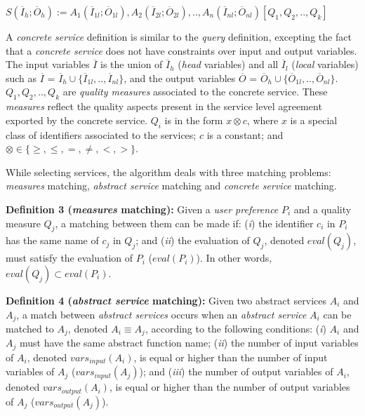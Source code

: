 \begin{center}

\begin{math}
S (\overline{I}_{h}; \overline{O}_{h}) := A_{1}(\overline{I}_{1l}; \overline{O}_{1l}), A_{2}(\overline{I}_{2l}; \overline{O}_{2l}), ..,  A_{n}(\overline{I}_{nl}; \overline{O}_{nl})[Q_{1},Q_{2}, .., Q_{k}]
\end{math}

\end{center} 

A \textit{concrete service} definition is similar to the \textit{query} definition, excepting the fact that a \textit{concrete service} does not have constraints over input and output variables.
The input variables $\overline{I}$ is the union of $\overline{I}_{h}$ (\textit{head} variables) and all $\overline{I}_{l}$ (\textit{local} variables) such as  
$\overline{I}$ =  $\overline{I}_{h} \cup \lbrace\overline{I}_{1l},..,\overline{I}_{nl}\rbrace$, and 
the output variables $\overline{O}$ = $\overline{O}_{h} \cup \lbrace\overline{O}_{1l},..,\overline{O}_{nl}\rbrace$.
$Q_{1},Q_{2}, .., Q_{k}$ are \textit{quality measures} associated to the concrete service. 
These \textit{measures} reflect the quality aspects present in the service level agreement exported by the concrete service. 
$Q_{i}$ is in the form $x \otimes c$, where $x$ is a special class of identifiers associated to the services; $c$ is a constant; and $\otimes \in\lbrace \geq, \leq, =, \neq, <, >\rbrace$.
 
While selecting services, the algorithm deals with three matching problems: \textit{measures} matching, \textit{abstract service} matching and \textit{concrete service} matching.

\noindent \textbf{Definition 3 (\textit{measures} matching):} 
Given a \textit{user preference} $P_{i}$ and a quality measure $Q_{j}$, a matching between them can be made if:
(\textit{i}) the identifier $c_{i}$ in $P_{i}$ has the same name of $c_{j}$ in $Q_{j}$; and
(\textit{ii}) the evaluation of $Q_{j}$, denoted $eval(Q_{j})$, must satisfy the evaluation of $P_{i}$ ($eval(P_{i})$). In other words, $eval(Q_{j}) \subset eval(P_{i})$.

\noindent \textbf{Definition 4 (\textit{abstract service} matching):} 
Given two abstract services $A_{i}$ and $A_{j}$, a match between \textit{abstract services} occurs when an \textit{abstract service} $A_{i}$ can be matched to $A_{j}$, denoted $A_{i} \equiv A_{j}$, according to the following conditions: 
(\textit{i}) $A_{i}$ and $A_{j}$ must have the same abstract function name; 
(\textit{ii}) the number of input variables of $A_{i}$, denoted $vars_{input}(A_{i})$, is equal or higher than the number of input variables of $A_{j}$ ($vars_{input}(A_{j})$); and 
(\textit{iii}) the number of output variables of $A_{i}$, denoted $vars_{output}(A_{i})$, is equal or higher than the number of output variables of $A_{j}$ ($vars_{output}(A_{j})$).

